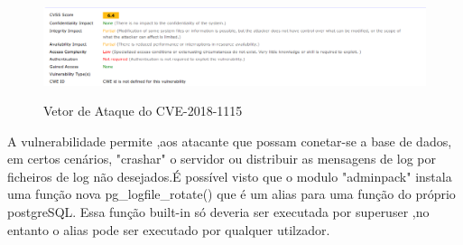 \begin{figure}[h!]
	\centering
		
	\includegraphics[width=\textwidth,height=3cm,keepaspectratio]{images/postgreSQLCVE.png}
		
	\caption{Vetor de Ataque do CVE-2018-1115}
		
	\label{fig:postgreSQL}
\end{figure}

A vulnerabilidade permite ,aos atacante que possam conetar-se a base de dados, em certos cenários, "crashar" o servidor ou distribuir as mensagens de log por ficheiros de log não desejados.É possível visto que o modulo "adminpack" instala uma função nova pg\_logfile\_rotate() que é um alias para uma função do próprio postgreSQL. Essa função built-in só deveria ser executada por superuser ,no entanto o alias pode ser executado por qualquer utilzador.

\clearpage